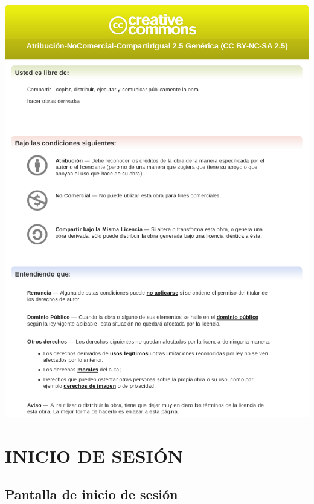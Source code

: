 \documentclass[12pt,letterpaper]{book}
\begin{document}
\begin{center}

\includegraphics[scale=0.82]{img/CreativeCom2.png}\\
\includegraphics[scale=0.82]{img/CreativeCom1.png}  
\end{center}

\tableofcontents
\part{INICIO DE SESIÓN}
\chapter{Pantalla de inicio de sesión}
\end{document}

